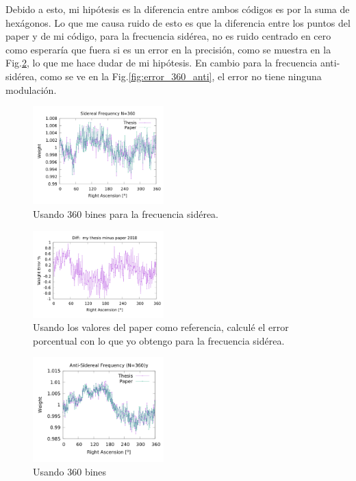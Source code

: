 Debido a esto, mi hipótesis es la diferencia entre ambos códigos es por la suma de hexágonos. Lo que me causa ruido de esto es que la diferencia entre los puntos del paper y de mi código, para la frecuencia sidérea,  no es ruido centrado en cero como esperaría que fuera si es un error en la precisión, como se muestra en la Fig.\ref{fig:error_360_sid}, lo que me hace dudar de mi hipótesis. En cambio para la frecuencia anti-sidérea, como se ve en la Fig.\ref{fig:error_360_anti}, el error no tiene ninguna modulación.

\begin{figure}[H]
	\centering
	\includegraphics[width=0.45\textwidth]{Graficos/sidereal_my_and_paper_in_360.png}
	\caption{Usando 360 bines para la frecuencia sidérea.}
	\label{fig:sid_360}
\end{figure}


\begin{figure}[H]
	\centering
	\includegraphics[width=0.45\textwidth]{Graficos/sidereal_my_and_paper_in_360_error.png}
	\caption{Usando los valores del paper como referencia, calculé el error porcentual con lo que yo obtengo para la frecuencia sidérea.}
	\label{fig:error_360_sid}
\end{figure}



\begin{figure}[H]
	\centering
	\includegraphics[width=0.45\textwidth]{Graficos/anti_my_and_paper_in_360.png}
	\caption{Usando 360 bines}
	\label{fig:anti_360}
\end{figure}


